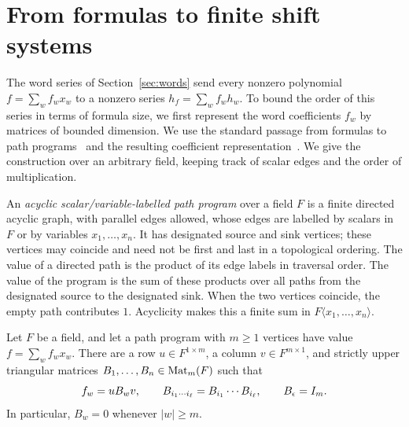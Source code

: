 \section{From formulas to finite shift systems}
\label{sec:systems}

The word series of Section~\ref{sec:words} send every nonzero polynomial
$f=\sum_w f_w x_w$ to a nonzero series $h_f=\sum_w f_w h_w$.
To bound the order of this series in terms of formula size, we first represent
the word coefficients $f_w$ by matrices of bounded dimension.  We use the standard passage
from formulas to path programs~\cite[Section~2.1, Lemma~2, Step~1]{RS2005}
and the resulting coefficient representation~\cite[Lemma~3.1]{OAInc}.
We give the construction over an arbitrary field, keeping track of scalar
edges and the order of multiplication.

An \emph{acyclic scalar/variable-labelled path program} over a field $F$ is a
finite directed acyclic graph, with parallel edges allowed, whose edges are
labelled by scalars in $F$ or by variables $x_1,\ldots,x_n$.  It has designated
source and sink vertices; these vertices may coincide and need not be first
and last in a topological ordering.  The value of a directed path is the
product of its edge labels in traversal order.  The value of the program is
the sum of these products over all paths from the designated source to the
designated sink.  When the two vertices coincide, the empty path contributes
$1$.  Acyclicity makes this a finite sum in
$F\langle x_1,\ldots,x_n\rangle$.

\begin{lemma}
\label{lem:acyclic-representation}
Let $F$ be a field, and let a path program with $m\geq 1$ vertices have value
$f=\sum_w f_w x_w$.  There are a row $u\in F^{1\times m}$, a column
$v\in F^{m\times 1}$, and strictly upper triangular matrices
$B_1,\ldots,B_n\in\operatorname{Mat}_m(F)$ such that
\begin{equation}
\label{eq:coefficient-representation}
 f_w=uB_wv,
 \qquad
 B_{i_1\cdots i_\ell}=B_{i_1}\cdots B_{i_\ell},
 \qquad B_\epsilon=I_m.
\end{equation}
In particular, $B_w=0$ whenever $|w|\geq m$.
\end{lemma}

